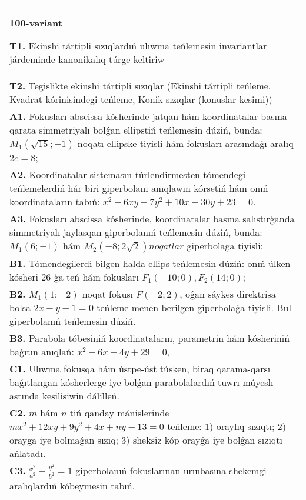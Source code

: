 \documentclass{article}
\begin{document}
\begin{tabular}{m{17cm}}
\textbf{100-variant}
\newline

\textbf{T1.} Ekinshi tártipli sızıqlardıń ulıwma teńlemesin invariantlar járdeminde kanonikalıq túrge keltiriw \\
\textbf{T2.} Tegislikte ekinshi tártipli sızıqlar (Ekinshi tártipli teńleme, Kvadrat kórinisindegi teńleme, Konik sızıqlar (konuslar kesimi)) \\
\textbf{A1.} Fokusları abscissa kósherinde jatqan hám koordinatalar basına qarata simmetriyalı bolǵan ellipstiń teńlemesin dúziń, bunda: $M_1 (\sqrt{15};-1) $ noqatı ellipske tiyisli hám fokusları arasındaǵı aralıq $2 c=8$; \\
\textbf{A2.} Koordinatalar sistemasın túrlendirmesten tómendegi teńlemelerdiń hár biri giperbolanı anıqlawın kórsetiń hám onıń koordinataların tabıń: $x^2-6 x y-7 y^2+10 x-30 y+23=0$. \\
\textbf{A3.} Fokusları abscissa kósherinde, koordinatalar basına salıstırģanda simmetriyalı jaylasqan giperbolanıń teńlemesin dúziń, bunda: $M_1 (6;-1) $ hám $M_2 (-8; 2 \sqrt{2}) noqatlar $ giperbolaga tiyisli; \\
\textbf{B1.} Tómendegilerdi bilgen halda ellips teńlemesin dúziń: onıń úlken kósheri 26 ģa teń hám fokusları $F_1 (-10; 0), F_2 (14; 0) $; \\
\textbf{B2.} $M_1 (1;-2) $ noqat fokusı $F (-2; 2) $, oǵan sáykes direktrisa bolsa $2x-y-1=0$ teńleme menen berilgen giperbolaǵa tiyisli. Bul giperbolanıń teńlemesin dúziń. \\
\textbf{B3.} Parabola tóbesiniń koordinataların, parametrin hám kósheriniń baǵıtın anıqlań: $x^2-6 x-4 y+29=0$, \\
\textbf{C1.} Ulıwma fokusqa hám ústpe-úst túsken, biraq qarama-qarsı baǵıtlangan kósherlerge iye bolǵan parabolalardıń tuwrı múyesh astında kesilisiwin dálilleń. \\
\textbf{C2.} $m$ hám $n$ tiń qanday mánislerinde $m x^2+12 x y+9 y^2+4 x+n y-13=0$ teńleme: 1) oraylıq sızıqtı; 2) orayga iye bolmaǵan sızıq; 3) sheksiz kóp orayǵa iye bolǵan sızıqtı ańlatadı. \\
\textbf{C3.} $\frac{x^2}{a^2}-\frac{y^2}{b^2}=1$ giperbolanıń fokuslarınan urınbasına shekemgi aralıqlardıń kóbeymesin tabıń. \\

\end{tabular}
\vspace{1cm}
\end{document}
